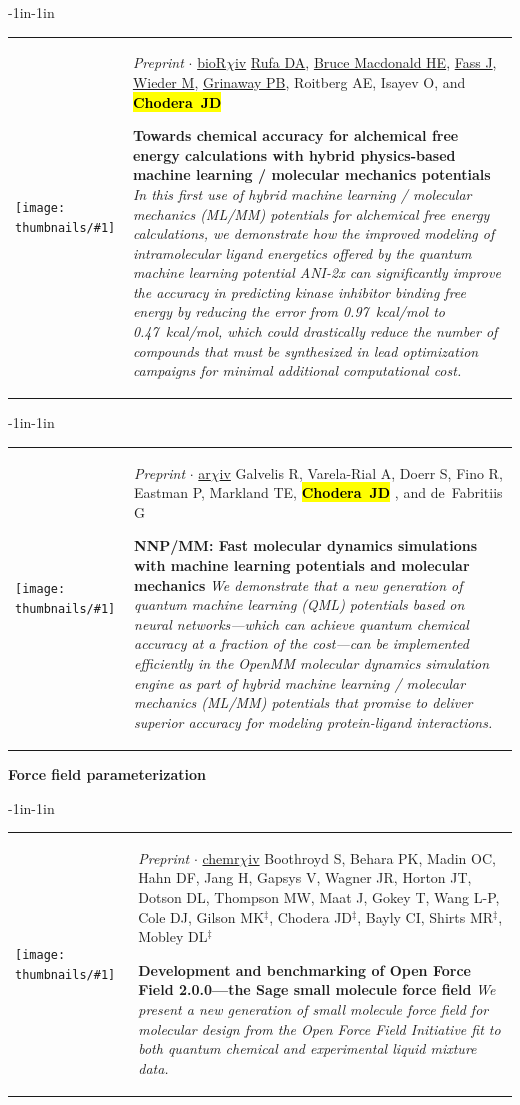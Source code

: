 \documentclass[10pt]{article}
\newcommand{\newarticle}[7]{
\begin{adjustwidth}{-1in}{-1in}  
\begin{tabular}{p{0.9in}p{7in}}
\parbox[c]{0.9in}{\texttt{[image: thumbnails/\#1]}} & \parbox[c]{6in}{\setstretch{0.9} {\small #4} $\cdot$ \href{#6}{#5} \\ {\footnotesize {#2}} \\ \raggedright { \bf\nohyphens{#3}}  \\ {\footnotesize\emph {#7}}} %
\end{tabular}
\end{adjustwidth}
\vspace{0.2in}
}
\newcommand{\jdc}{ {\bf \hl{Chodera~JD}} } %
\begin{document}
\newarticle{hybrid-qm-mm.jpg}{\underline{Rufa DA}, \underline{Bruce Macdonald HE}, \underline{Fass J}, \underline{Wieder M}, \underline{Grinaway PB}, Roitberg AE, Isayev O, and \jdc}{Towards chemical accuracy for alchemical free energy calculations with hybrid physics-based machine learning / molecular mechanics potentials}{\emph{Preprint}}{bioR$\chi$iv}{https://doi.org/10.1101/2020.07.29.227959}{In this first use of hybrid machine learning / molecular mechanics (ML/MM) potentials for alchemical free energy calculations, we demonstrate how the improved modeling of intramolecular ligand energetics offered by the quantum machine learning potential ANI-2x can significantly improve the accuracy in predicting kinase inhibitor binding free energy by reducing the error from 0.97~kcal/mol to 0.47~kcal/mol, which could drastically reduce the number of compounds that must be synthesized in lead optimization campaigns for minimal additional computational cost.}

\newarticle{nnp-mm}{Galvelis R, Varela-Rial A, Doerr S, Fino R, Eastman P, Markland TE,  \jdc, and de~Fabritiis G}{NNP/MM: Fast molecular dynamics simulations with machine learning potentials and molecular mechanics}{\emph{Preprint}}{ar$\chi$iv}{https://arxiv.org/abs/2201.08110}{We demonstrate that a new generation of quantum machine learning (QML) potentials based on neural networks---which can achieve quantum chemical accuracy at a fraction of the cost---can be implemented efficiently in the OpenMM molecular dynamics simulation engine as part of hybrid machine learning / molecular mechanics (ML/MM) potentials that promise to deliver superior accuracy for modeling protein-ligand interactions.}

\eject

{\bf Force field parameterization}\\

\newarticle{sage}{Boothroyd S, Behara PK, Madin OC, Hahn DF, Jang H, Gapsys V, Wagner JR, Horton JT, Dotson DL, Thompson MW, Maat J, Gokey T, Wang L-P, Cole DJ, Gilson MK$^\ddag$, Chodera JD$^\ddag$, Bayly CI, Shirts MR$^\ddag$, Mobley DL$^\ddag$}{Development and benchmarking of Open Force Field 2.0.0---the Sage small molecule force field}{\emph{Preprint}}{chemr$\chi$iv}{https://chemrxiv.org/engage/chemrxiv/article-details/637938cbe70b0a110aa33b8b}{We present a new generation of small molecule force field for molecular design from the Open Force Field Initiative fit to both quantum chemical and experimental liquid mixture data.}
\end{document}
